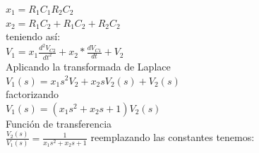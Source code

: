 \documentclass[
	12pt, %
]{fphw}
\begin{document}
$x_{1} = R_{1}C_{1}R_{2}C_{2}$ \\
$x_{2} = R_{1}C_{2}+R_{1}C_{2}+R_{2}C_{2}$ \\

teniendo así: \\

$V_{1} = x_{1} \frac{d^{2}V_{C2}}{dt^{2}} + x_{2}*\frac{dV_{C1}}{dt} + V_{2}$ \\

Aplicando la transformada de Laplace \\

$V_{1}(s) = x_{1}s^{2}V_{2} + x_{2}sV_{2}(s) + V_{2}(s)$ \\

factorizando \\

$V_{1}(s) = (x_{1}s^{2}+x_{2}s+1)V_{2}(s)$ \\

Función de transferencia \\

$\frac{V_{2}(s)}{V_{1}(s)} =  \frac{1}{x_{1}s^{2}+x_{2}s+1}$ reemplazando las constantes tenemos: \\

\end{document}
